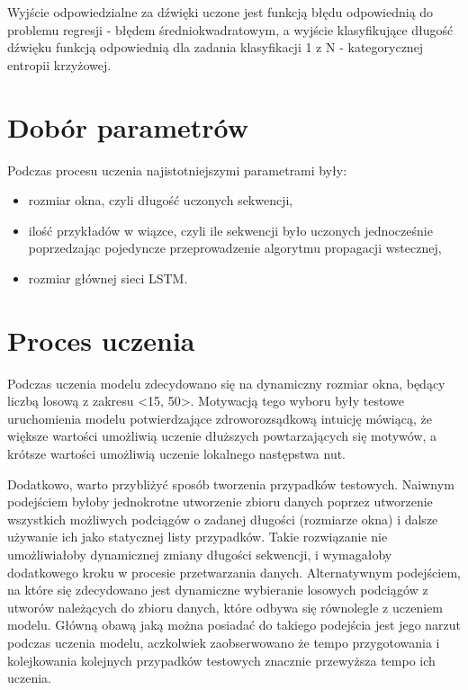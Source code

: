{{        Wyjście odpowiedzialne za dźwięki uczone jest funkcją błędu odpowiednią do problemu 
        regresji - błędem średniokwadratowym, a wyjście klasyfikujące długość dźwięku funkcją odpowiednią
        dla zadania klasyfikacji 1 z N - kategorycznej entropii krzyżowej.
    }

    \section{Dobór parametrów}
    {
        Podczas procesu uczenia najistotniejszymi parametrami były:
        \begin{itemize}
            \item rozmiar okna, czyli długość uczonych sekwencji,
            \item ilość przykładów w wiązce, czyli ile sekwencji było uczonych jednocześnie
            poprzedzając pojedyncze przeprowadzenie algorytmu propagacji wstecznej,
            \item rozmiar głównej sieci LSTM.
        \end{itemize}
    }

    \section{Proces uczenia}
    {
        Podczas uczenia modelu zdecydowano się na dynamiczny rozmiar okna,
        będący liczbą losową z zakresu <15, 50>. Motywacją tego wyboru były testowe 
        uruchomienia modelu potwierdzające zdroworozsądkową intuicję mówiącą, że większe wartości
        umożliwią uczenie dłuższych powtarzających się motywów, a krótsze wartości umożliwią uczenie lokalnego następstwa nut.

        Dodatkowo, warto przybliżyć sposób tworzenia przypadków testowych. Naiwnym podejściem byłoby
        jednokrotne utworzenie zbioru danych poprzez utworzenie wszystkich możliwych podciągów o zadanej
        długości (rozmiarze okna) i dalsze używanie ich jako statycznej listy przypadków. 
        Takie rozwiązanie nie umożliwiałoby dynamicznej zmiany długości sekwencji, i wymagałoby dodatkowego 
        kroku w procesie przetwarzania danych. Alternatywnym podejściem, na które się zdecydowano jest dynamiczne
        wybieranie losowych podciągów z utworów należących do zbioru danych, które odbywa się równolegle z uczeniem modelu. 
        Główną obawą jaką można posiadać do takiego podejścia jest jego narzut podczas uczenia modelu, 
        aczkolwiek zaobserwowano że tempo przygotowania i kolejkowania kolejnych przypadków testowych znacznie przewyższa tempo ich uczenia.

}}
